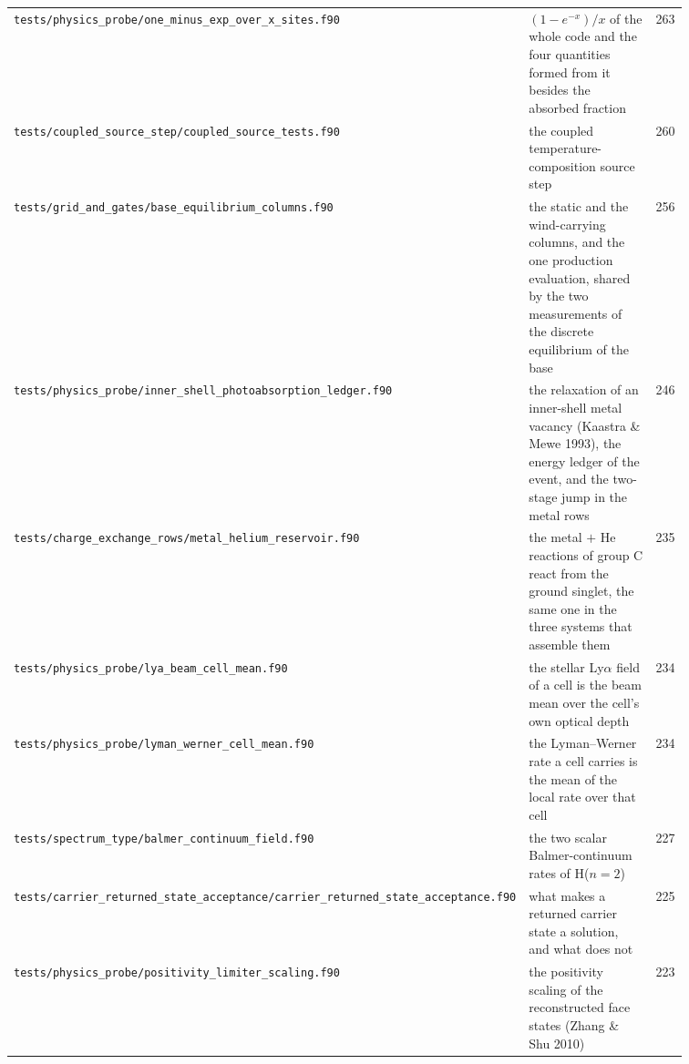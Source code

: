 {\begin{longtable}{@{}>{\raggedright\arraybackslash}p{0.36\linewidth} >{\raggedright\arraybackslash}p{0.50\linewidth} r@{}}
\texttt{tests/\allowbreak physics\_\allowbreak probe/\allowbreak one\_\allowbreak minus\_\allowbreak exp\_\allowbreak over\_\allowbreak x\_\allowbreak sites.f90} & $(1-e^{-x})/x$ of the whole code and the four quantities formed from it besides the absorbed fraction & 263 \\
\texttt{tests/\allowbreak coupled\_\allowbreak source\_\allowbreak step/\allowbreak coupled\_\allowbreak source\_\allowbreak tests.f90} & the coupled temperature-composition source step & 260 \\
\texttt{tests/\allowbreak grid\_\allowbreak and\_\allowbreak gates/\allowbreak base\_\allowbreak equilibrium\_\allowbreak columns.f90} & the static and the wind-carrying columns, and the one production evaluation, shared by the two measurements of the discrete equilibrium of the base & 256 \\
\texttt{tests/\allowbreak physics\_\allowbreak probe/\allowbreak inner\_\allowbreak shell\_\allowbreak photoabsorption\_\allowbreak ledger.f90} & the relaxation of an inner-shell metal vacancy (Kaastra \& Mewe 1993), the energy ledger of the event, and the two-stage jump in the metal rows & 246 \\
\texttt{tests/\allowbreak charge\_\allowbreak exchange\_\allowbreak rows/\allowbreak metal\_\allowbreak helium\_\allowbreak reservoir.f90} & the metal $+$ He reactions of group C react from the ground singlet, the same one in the three systems that assemble them & 235 \\
\texttt{tests/\allowbreak physics\_\allowbreak probe/\allowbreak lya\_\allowbreak beam\_\allowbreak cell\_\allowbreak mean.f90} & the stellar Ly$\alpha$ field of a cell is the beam mean over the cell's own optical depth & 234 \\
\texttt{tests/\allowbreak physics\_\allowbreak probe/\allowbreak lyman\_\allowbreak werner\_\allowbreak cell\_\allowbreak mean.f90} & the Lyman--Werner rate a cell carries is the mean of the local rate over that cell & 234 \\
\texttt{tests/\allowbreak spectrum\_\allowbreak type/\allowbreak balmer\_\allowbreak continuum\_\allowbreak field.f90} & the two scalar Balmer-continuum rates of H($n{=}2$) & 227 \\
\texttt{tests/\allowbreak carrier\_\allowbreak returned\_\allowbreak state\_\allowbreak acceptance/\allowbreak carrier\_\allowbreak returned\_\allowbreak state\_\allowbreak acceptance.f90} & what makes a returned carrier state a solution, and what does not & 225 \\
\texttt{tests/\allowbreak physics\_\allowbreak probe/\allowbreak positivity\_\allowbreak limiter\_\allowbreak scaling.f90} & the positivity scaling of the reconstructed face states (Zhang \& Shu 2010) & 223 \\

\end{longtable}}

